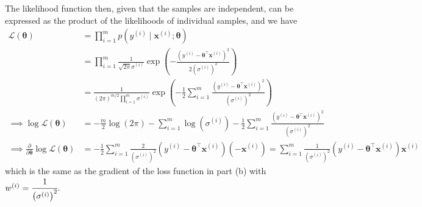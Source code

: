 The likelihood function then, given that the samples are independent, can be expressed as the product of the likelihoods of individual samples, and we have
\begin{align*}
    \mathcal{L}(\boldsymbol{\theta})
     & =
    \prod_{i=1}^{m}
    p\left(y^{(i)} \mid \mathbf{x}^{(i)} ; \boldsymbol{\theta}\right)
    \\ & =
    \prod_{i=1}^{m}
    \frac{1}{\sqrt{2 \pi} \sigma^{(i)}} \exp \left(-\frac{{\left(y^{(i)}-\boldsymbol{\theta}^{\top} \mathbf{x}^{(i)}\right)}^{2}}{2{\left(\sigma^{(i)}\right)}^{2}}\right)
    \\ & =
    \frac{1}{\left(2 \pi\right)^{m/2} \prod_{i=1}^{m} \sigma^{(i)}}
    \exp \left(
    -\frac{1}{2}
    \sum_{i=1}^{m}
    \frac{{\left(y^{(i)}-\boldsymbol{\theta}^{\top} \mathbf{x}^{(i)}\right)}^{2}}{{\left(\sigma^{(i)}\right)}^{2}}
    \right)
    \\
    \implies
    \log \mathcal{L}(\boldsymbol{\theta})
     & =
    -\frac{m}{2} \log(2 \pi) - \sum_{i=1}^{m} \log \left( \sigma^{(i)} \right)
    -\frac{1}{2}
    \sum_{i=1}^{m}
    \frac{{\left(y^{(i)}-\boldsymbol{\theta}^{\top} \mathbf{x}^{(i)}\right)}^{2}}{{\left(\sigma^{(i)}\right)}^{2}}
    \\
    \implies
    \frac{\partial}{\partial \boldsymbol{\theta}} \log \mathcal{L}(\boldsymbol{\theta})
     & =
    - \frac{1}{2}
    \sum_{i=1}^{m}
    \frac{2}{\left(\sigma^{(i)}\right)^{2}}
    \left(y^{(i)}-\boldsymbol{\theta}^{\top} \mathbf{x}^{(i)}\right)
    \left( -\mathbf{x}^{(i)} \right)
    =
    \sum_{i=1}^{m}
    \frac{1}{\left(\sigma^{(i)}\right)^{2}}
    \left(y^{(i)}-\boldsymbol{\theta}^{\top} \mathbf{x}^{(i)}\right)
    \mathbf{x}^{(i)}
\end{align*}
which is the same as the gradient of the loss function in part (b) with \( w^{(i)} = \cfrac{1}{\left(\sigma^{(i)}\right)^{2}} \).
